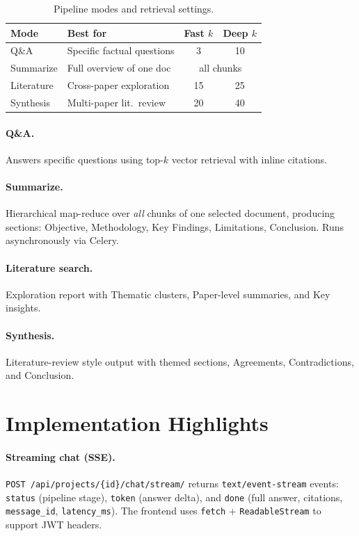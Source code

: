\documentclass[sigplan,review,anonymous]{acmart}
\begin{document}
\begin{table}[t]
  \caption{Pipeline modes and retrieval settings.}
  \label{tab:modes}
  \small
  \begin{tabular}{@{}llcc@{}}
    \toprule
    \textbf{Mode} & \textbf{Best for} & \textbf{Fast $k$} & \textbf{Deep $k$} \\
    \midrule
    Q\&A & Specific factual questions & 3 & 10 \\
    Summarize & Full overview of one doc & \multicolumn{2}{c}{all chunks} \\
    Literature & Cross-paper exploration & 15 & 25 \\
    Synthesis & Multi-paper lit.\ review & 20 & 40 \\
    \bottomrule
  \end{tabular}
\end{table}

\paragraph{Q\&A.}
Answers specific questions using top-$k$ vector retrieval with inline citations.

\paragraph{Summarize.}
Hierarchical map-reduce over \emph{all} chunks of one selected document, producing sections:
Objective, Methodology, Key Findings, Limitations, Conclusion.
Runs asynchronously via Celery.

\paragraph{Literature search.}
Exploration report with Thematic clusters, Paper-level summaries, and Key insights.

\paragraph{Synthesis.}
Literature-review style output with themed sections, Agreements, Contradictions, and Conclusion.

\section{Implementation Highlights}
\label{sec:impl}

\paragraph{Streaming chat (SSE).}
\texttt{POST /api/projects/\{id\}/chat/stream/} returns \texttt{text/event-stream} events:
\texttt{status} (pipeline stage), \texttt{token} (answer delta), and \texttt{done}
(full answer, citations, \texttt{message\_id}, \texttt{latency\_ms}).
The frontend uses \texttt{fetch} + \texttt{ReadableStream} to support JWT headers.
\end{document}
